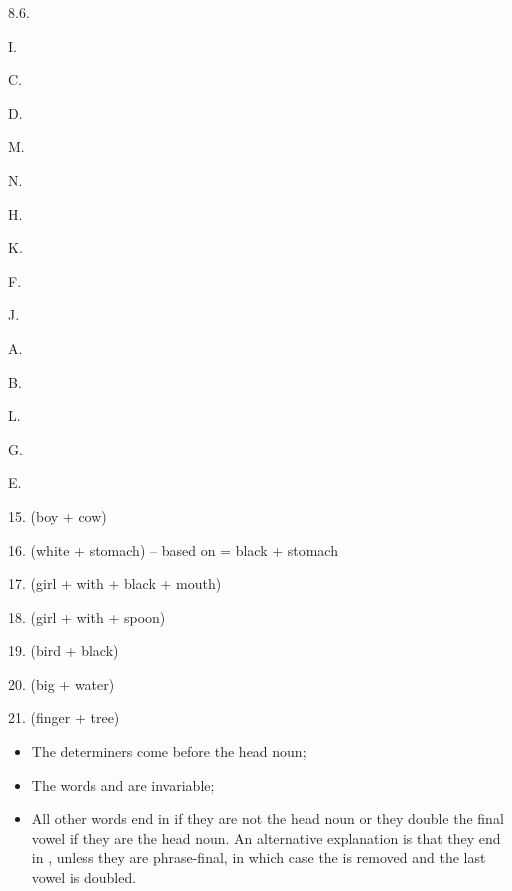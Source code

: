 \begin{refsection}
\begin{practiceproblemsolution}{8.6. \langnameHausa}
 \begin{solutions}[label=Solution 8.6\alph*]
     \item
     \begin{enumerate}
     \begin{multicols}{7}
        \item I.
        \item C.
        \item D.
        \item M.
        \item N.
        \item H.
        \item K.
        \item F.
        \item J.
        \item A.
        \item B.
        \item L.
        \item G.
        \item E.
     \end{multicols}
     \end{enumerate}
     \item 15.  (boy + cow)
     \item[] 16.  (white + stomach) -- based on  = black + stomach
     \item[] 17.  (girl + with + black + mouth)
     \item 18.  (girl + with + spoon)
     \item[] 19.  (bird + black)
     \item[] 20.  (big + water)
     \item[] 21.  (finger + tree)
 \end{solutions}

 \begin{itemize}
 \item The determiners come before the head noun;
 \item The words  and  are invariable;
 \item All other words end in  if they are not the head noun or they double the final vowel if they are the head noun. An alternative explanation is that they end in , unless they are phrase-final, in which case the  is removed and the last vowel is doubled.



\end{itemize}
\end{practiceproblemsolution}
\end{refsection}
